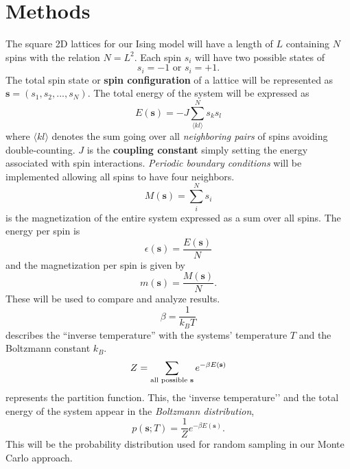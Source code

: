 \documentclass[english,notitlepage,reprint,nofootinbib]{revtex4-1}  %
\begin{document}
\section{Methods}\label{sec:methods}
The square 2D lattices for our Ising model will have a length of $L$ containing $N$ spins with the relation $N = L^2$. Each spin $s_i$ will have two possible states of 
\begin{equation}
    s_i = -1 \text{ or } s_i = +1.
\end{equation}
The total spin state or \textbf{spin configuration} of a lattice will be represented as $\textbf{s} = (s_1, s_2, ..., s_N)$. The total energy of the system will be expressed as
\begin{equation}
    E(\textbf{s}) = - J \sum^N_{\langle kl \rangle} s_k s_l
\end{equation}
where $\langle kl \rangle$ denotes the sum going over all \textit{neighboring pairs} of spins avoiding double-counting. $J$ is the \textbf{coupling constant} simply setting the energy associated with spin interactions. \textit{Periodic boundary conditions} will be implemented allowing all spins to have four neighbors.
\begin{equation}
    M(\textbf{s}) = \sum^N_i s_i
\end{equation}
is the magnetization of the entire system expressed as a sum over all spins. The energy per spin is
\begin{equation}
    \epsilon(\textbf{s}) = \frac{E(\textbf{s})}{N}
\end{equation}
and the magnetization per spin is given by
\begin{equation}
    m(\textbf{s}) = \frac{M(\textbf{s})}{N}.
\end{equation}
These will be used to compare and analyze results.
\begin{equation}
    \beta = \frac{1}{k_B T}
\end{equation}
describes the ``inverse temperature'' with the systems' temperature $T$ and the Boltzmann constant $k_B$.
\begin{equation}
    Z = \sum_{\text{all possible \textbf{s}}} e^{- \beta E(\textbf{s})}
\end{equation}
represents the partition function. This, the `inverse temperature'' and the total energy of the system appear in the \textit{Boltzmann distribution},
\begin{equation}
    p(\textbf{s};T) = \frac{1}{Z} e^{-\beta E(\textbf{s})}. \label{eq:prob_dist}
\end{equation}
This will be the probability distribution used for random sampling in our Monte Carlo approach. 
\end{document}
